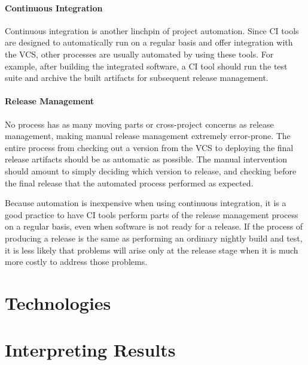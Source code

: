 \paragraph{Continuous Integration}

Continuous integration is another linchpin of project
automation. Since CI tools are designed to automatically run on a
regular basis and offer integration with the VCS, other processes are
usually automated by using these tools. For example, after building
the integrated software, a CI tool should run the test suite and
archive the built artifacts for subsequent release management.

\paragraph{Release Management}

No process has as many moving parts or cross-project concerns as
release management, making manual release management extremely
error-prone. The entire process from checking out a version from the
VCS to deploying the final release artifacts should be as automatic as
possible. The manual intervention should amount to simply deciding
which version to release, and checking before the final release that
the automated process performed as expected.

Because automation is inexpensive when using continuous integration,
it is a good practice to have CI tools perform parts of the release
management process on a regular basis, even when software is not ready
for a release. If the process of producing a release is the same as
performing an ordinary nightly build and test, it is less likely that
problems will arise only at the release stage when it is much more
costly to address those problems.

\section{Technologies}
\label{sec:technologies}

\section{Interpreting Results}
